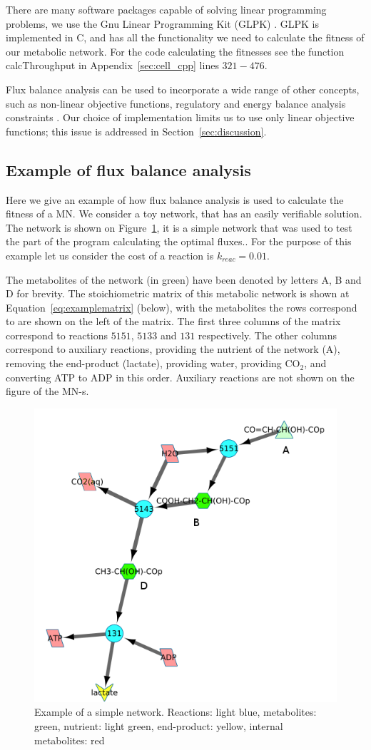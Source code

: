 \documentclass[a4paper,12pt]{article}
\begin{document}
	
	There are many software packages capable of solving linear programming problems, we use the Gnu Linear Programming Kit (GLPK) \cite{glpk}. GLPK is implemented in C, and has all the functionality we need to calculate the fitness of our metabolic network. For the code calculating the fitnesses see the function calcThroughput in Appendix~\ref{sec:cell_cpp} lines $321-476$.

	Flux balance analysis can be used to incorporate a wide range of other concepts, such as non-linear objective functions, regulatory and energy balance analysis constraints \cite{fbaconstraints}. Our choice of implementation limits us to use only linear objective functions; this issue is addressed in Section~\ref{sec:discussion}.

\subsection*{Example of flux balance analysis}
\label{sub:example_of_flux_balance_analysis}

Here we give an example of how flux balance analysis is used to calculate the fitness of a MN. We consider a toy network, that has an easily verifiable solution. The network is shown on Figure~\ref{fig:examplenetwork}, it is a simple network that was used to test the part of the program calculating the optimal fluxes.. For the purpose of this example let us consider the cost of a reaction is $k_{reac}=0.01$.


	The metabolites of the network (in green) have been denoted by letters A, B and D for brevity. The stoichiometric matrix of this metabolic network is shown at Equation~\ref{eq:examplematrix} (below), with the metabolites the rows correspond to are shown on the left of the matrix. The first three columns of the matrix correspond to reactions $5151$, $5133$ and $131$ respectively. The other columns correspond to auxiliary reactions, providing the nutrient of the network (A), removing the end-product (lactate), providing water, providing CO$_2$, and converting ATP to ADP in this order. Auxiliary reactions are not shown on the figure of the MN-s. 

\begin{figure}[htbp]
	\centering
	\includegraphics[width=0.5\linewidth]{initial_network_ABC.png}
	\caption{Example of a simple network. Reactions: light blue, metabolites: green, nutrient: light green, end-product: yellow, internal metabolites: red}
	\label{fig:examplenetwork}
\end{figure}
\end{document}
